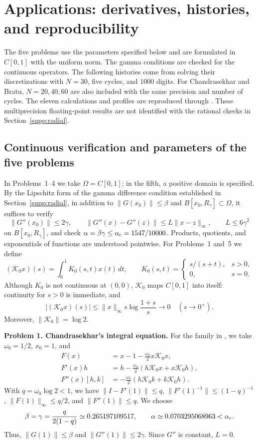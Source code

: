 \documentclass[11pt,a4paper]{article}
\numberwithin{equation}{section}
\numberwithin{table}{section}
\theoremstyle{plain}
\theoremstyle{definition}\newtheorem{definition}[theorem]{Definition}
\theoremstyle{remark}\newtheorem{remark}[theorem]{Remark}
\begin{document}
\section{Applications: derivatives, histories, and reproducibility}\label{supp:applications}
The five problems use the parameters specified below and are formulated
in $C[0,1]$ with the uniform norm. The gamma conditions are checked
for the continuous operators. The following histories come from
solving their discretizations with $N=30$, five cycles, and $1000$
digits. For Chandrasekhar and Bratu, $N=20,40,60$ are also included
with the same precision and number of cycles. The eleven calculations
and profiles are reproduced through
.
These multiprecision floating-point results are not identified with
the rational checks in Section~\ref{supp:radial}.

\subsection{Continuous verification and parameters of the five problems}


In Problems~1--4 we take $\Omega=C[0,1]$; in the fifth, a positive
domain is specified. By the Lipschitz form of the gamma difference condition established in Section~\ref{supp:radial},
in addition to $\|G(x_0)\|\leq\beta$ and
$B[x_0,R_\gamma]\subset\Omega$, it suffices to verify
\[
 \|G''(x_0)\|\leq2\gamma,\qquad
 \|G''(x)-G''(z)\|\leq L\|x-z\|_\infty,\qquad L\leq6\gamma^2
\]
on $B[x_0,R_\gamma]$, and check
$\alpha=\beta\gamma\leq\alpha_{\rm c}=1547/10000$.
Products, quotients, and exponentials of functions are understood
pointwise. For Problems~1 and~5 we define
\[
 (\mathcal K_0x)(s)=\int_0^1K_0(s,t)x(t)\,dt,\qquad
 K_0(s,t)=\begin{cases}s/(s+t),&s>0,\\0,&s=0.\end{cases}
\]
Although $K_0$ is not continuous at $(0,0)$, $\mathcal K_0$ maps
$C[0,1]$ into itself: continuity for $s>0$ is immediate, and
\[
 |(\mathcal K_0x)(s)|\leq\|x\|_\infty s\log\frac{1+s}{s}
 \longrightarrow0\quad(s\to0^+).
\]
Moreover, $\|\mathcal K_0\|=\log2$.

\medskip
\noindent\textbf{Problem 1. Chandrasekhar's integral equation.}
For the family in \cite{EzquerroHernandezMagrenan2021}, we take
$\omega_0=1/2$, $x_0=1$, and
\[
\begin{aligned}
 F(x)&=x-1-\tfrac{\omega_0}{2}x\mathcal K_0x,\\
 F'(x)h&=h-\tfrac{\omega_0}{2}(h\mathcal K_0x+x\mathcal K_0h),\\
 F''(x)[h,k]&=-\tfrac{\omega_0}{2}(h\mathcal K_0k+k\mathcal K_0h).
\end{aligned}
\]
With $q=\omega_0\log2<1$, we have $\|I-F'(1)\|\leq q$,
$\|F'(1)^{-1}\|\leq(1-q)^{-1}$, $\|F(1)\|_\infty\leq q/2$,
and $\|F''(1)\|\leq q$. We choose
\[
 \beta=\gamma=\frac{q}{2(1-q)}\simeq0.265197109517,\qquad
 \alpha\simeq0.0703295068963<\alpha_{\rm c}.
\]
Thus, $\|G(1)\|\leq\beta$ and $\|G''(1)\|\leq2\gamma$.
Since $G''$ is constant, $L=0$.
\end{document}
